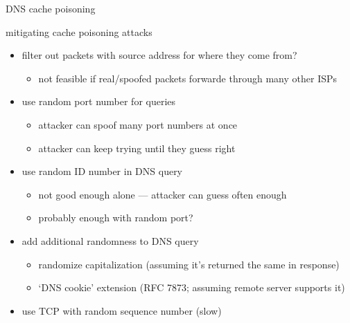 \begin{frame}{DNS cache poisoning}
\end{frame}

\begin{frame}{mitigating cache poisoning attacks}
    \begin{itemize}
    \item filter out packets with source address for where they come from?
        \begin{itemize}
        \item not feasible if real/spoofed packets forwarde through many other ISPs
        \end{itemize}
    \item use random port number for queries
        \begin{itemize}
        \item attacker can spoof many port numbers at once
        \item attacker can keep trying until they guess right
        \end{itemize}
    \item use random ID number in DNS query
        \begin{itemize}
        \item not good enough alone --- attacker can guess often enough
        \item probably enough with random port?
        \end{itemize}
    \item add additional randomness to DNS query
        \begin{itemize}
        \item randomize capitalization (assuming it's returned the same in response)
        \item `DNS cookie' extension (RFC 7873; assuming remote server supports it)
        \end{itemize}
    \item use TCP with random sequence number (slow)
    \end{itemize}
\end{frame}

